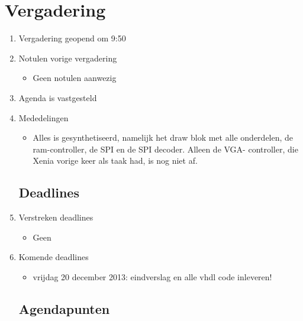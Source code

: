 \documentclass{article}
\begin{document}
\section*{Vergadering}
\begin{enumerate}
	
	\subsection*{Vooraf}
	\item Vergadering geopend om 9:50 %
	\item Notulen vorige vergadering
	\begin{itemize}
		\item Geen notulen aanwezig
	\end{itemize}
	\item Agenda is vastgesteld
	\item Mededelingen
	\begin{itemize}
		
		\item Alles is gesynthetiseerd, namelijk het draw blok met alle onderdelen, de ram-controller, de SPI en de SPI decoder. Alleen de VGA-				controller, die Xenia vorige keer als taak had, is nog niet af. 
	\end{itemize}

	\subsection*{Deadlines}
	\item Verstreken deadlines
	\begin{itemize}
		\item Geen
	\end{itemize}
	\item Komende deadlines
	\begin{itemize}
		\item vrijdag 20 december 2013: eindverslag en alle vhdl code inleveren!
	\end{itemize}

	\subsection*{Agendapunten}
	


\end{enumerate}
\end{document}
